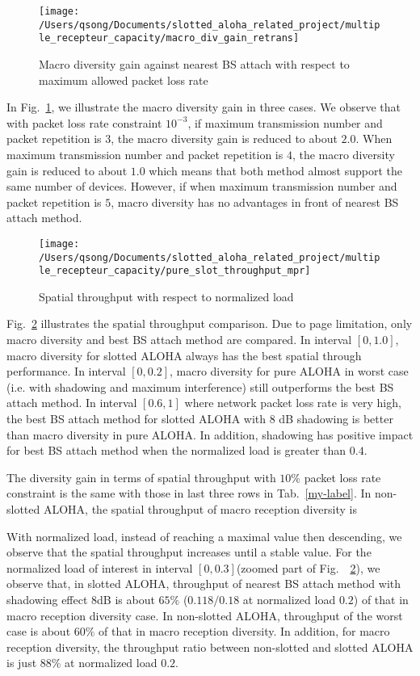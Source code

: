 \begin{figure}
	\centering
	\texttt{[image: /Users/qsong/Documents/slotted\_aloha\_related\_project/multiple\_recepteur\_capacity/macro\_div\_gain\_retrans]}
	\caption{Macro diversity gain against nearest BS attach with respect to maximum allowed packet loss rate}
	\label{fig:macrodivgainretrans}
\end{figure}

In Fig.~\ref{fig:macrodivgainretrans}, we illustrate the macro diversity gain in three cases. We observe that with packet loss rate constraint $10^{-3}$, if maximum transmission number and packet repetition is $3$, the macro diversity gain is reduced to about $2.0$. When maximum transmission number and packet repetition is $4$, the macro diversity gain is reduced to about $1.0$ which means that both method almost support the same number of devices. However, if when maximum transmission number and packet repetition is $5$, macro diversity has no advantages in front of nearest BS attach method.
\begin{figure}
	\centering
	\texttt{[image: /Users/qsong/Documents/slotted\_aloha\_related\_project/multiple\_recepteur\_capacity/pure\_slot\_throughput\_mpr]}
	\caption{Spatial throughput with respect to normalized load}
	\label{fig:pureslotthroughputmpr}
\end{figure}

Fig.~\ref{fig:pureslotthroughputmpr} illustrates the spatial throughput comparison. Due to page limitation, only macro diversity and best BS attach method are compared. In interval $\left[ 0, 1.0 \right]$, macro diversity for slotted ALOHA always has the best spatial through performance. In interval $\left[ 0, 0.2\right]$, macro diversity for pure ALOHA in worst case (i.e. with shadowing and maximum interference) still outperforms the best BS attach method.  In interval $\left[ 0.6, 1\right]$ where network packet loss rate is very high, the best BS attach method for slotted ALOHA with $8$ dB shadowing is better than macro diversity in pure ALOHA. In addition, shadowing has positive impact for best BS attach method when the normalized load is greater than $0.4$. 

The diversity gain in terms of spatial throughput with $10\%$ packet loss rate constraint is the same with those in last three rows in Tab.~\ref{my-label}.
In non-slotted ALOHA, the spatial throughput of macro reception diversity is 

With normalized load, instead of reaching a maximal value then descending, we observe that the spatial throughput increases until a stable value. For the normalized load of interest in interval $\left[ 0, 0.3\right]$(zoomed part of Fig.~~\ref{fig:pureslotthroughputmpr}), we observe that, in slotted ALOHA, throughput of nearest BS attach method with shadowing effect $8$dB is  
about $65\%$ ($0.118/0.18$ at normalized load $0.2$) of that in macro reception diversity case.
In non-slotted ALOHA, throughput of the worst case is about $60\%$ of that in macro reception diversity. In addition, for macro reception diversity, the throughput ratio between non-slotted and slotted ALOHA is just $88\%$ at normalized load $0.2$.


